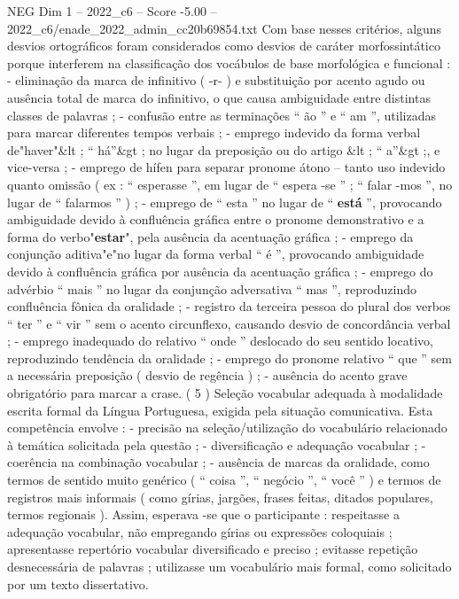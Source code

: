 \begin{textsample}{NEG Dim 1 – 2022\_c6 – Score -5.00 – 2022\_c6/enade\_2022\_admin\_cc20b69854.txt}
Com base nesses critérios, alguns desvios ortográficos foram considerados como desvios de caráter morfossintático porque interferem na classificação dos vocábulos de base morfológica e funcional : - eliminação da marca de infinitivo ( -r- ) e substituição por acento agudo ou ausência total de marca do infinitivo, o que causa ambiguidade entre distintas classes de palavras ; - confusão entre as terminações “ ão ” e “ am ”, utilizadas para marcar diferentes tempos verbais ; - emprego indevido da forma verbal de"haver"\&lt ; “ há”\&gt ; no lugar da preposição ou do artigo \&lt ; “ a”\&gt ;, e vice-versa ; - emprego de hífen para separar pronome átono – tanto uso indevido quanto omissão ( ex : “ esperasse ”, em lugar de “ espera -se ” ; “ falar -mos ”, no lugar de “ falarmos ” ) ; - emprego de “ esta ” no lugar de “ \textbf{está} ”, provocando ambiguidade devido à confluência gráfica entre o pronome demonstrativo e a forma do verbo"\textbf{estar}", pela ausência da acentuação gráfica ; - emprego da conjunção aditiva"e"no lugar da forma verbal “ é ”, provocando ambiguidade devido à confluência gráfica por ausência da acentuação gráfica ; - emprego do advérbio “ mais ” no lugar da conjunção adversativa “ mas ”, reproduzindo confluência fônica da oralidade ; - registro da terceira pessoa do plural dos verbos “ ter ” e “ vir ” sem o acento circunflexo, causando desvio de concordância verbal ; - emprego inadequado do relativo “ onde ” deslocado do seu sentido locativo, reproduzindo tendência da oralidade ; - emprego do pronome relativo “ que ” sem a necessária preposição ( desvio de regência ) ; - ausência do acento grave obrigatório para marcar a crase. ( 5 ) Seleção vocabular adequada à modalidade escrita formal da Língua Portuguesa, exigida pela situação comunicativa.
Esta competência envolve : - precisão na seleção/utilização do vocabulário relacionado à temática solicitada pela questão ; - diversificação e adequação vocabular ; - coerência na combinação vocabular ; - ausência de marcas da oralidade, como termos de sentido muito genérico ( “ coisa ”, “ negócio ”, “ você ” ) e termos de registros mais informais ( como gírias, jargões, frases feitas, ditados populares, termos regionais ).
Assim, esperava -se que o participante : respeitasse a adequação vocabular, não empregando gírias ou expressões coloquiais ; apresentasse repertório vocabular diversificado e preciso ; evitasse repetição desnecessária de palavras ; utilizasse um vocabulário mais formal, como solicitado por um texto dissertativo.

\end{textsample}

